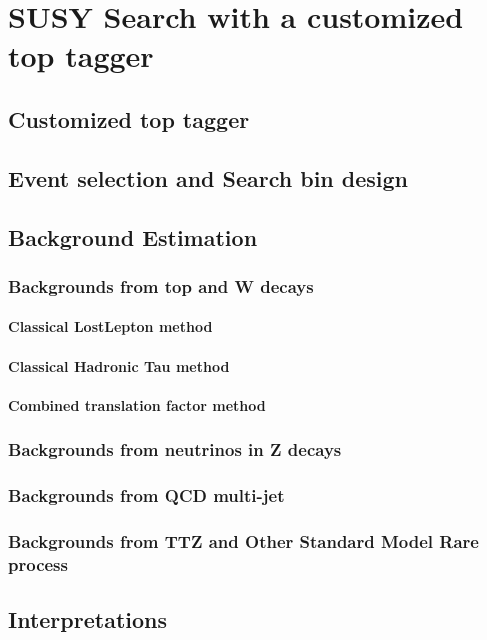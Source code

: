\chapter{SUSY Search with a customized top tagger}

\section{Customized top tagger}

\section{Event selection and Search bin design}

\section{Background Estimation}

\subsection{Backgrounds from top and W decays}
\subsubsection{Classical LostLepton method}
\subsubsection{Classical Hadronic Tau method}
\subsubsection{Combined translation factor method}

\clearpage
\subsection{Backgrounds from neutrinos in Z decays}

\clearpage
\subsection{Backgrounds from QCD multi-jet}
\label{sec:c4bgqcd}


\subsection{Backgrounds from TTZ and Other Standard Model Rare process}

\section{Interpretations}
